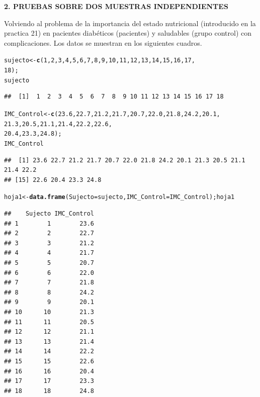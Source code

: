 \documentclass[12pt,letterpaper]{article}\usepackage[]{graphicx}\usepackage[]{color}
\makeatletter
\newcommand{\hlnum}[1]{\textcolor[rgb]{0.686,0.059,0.569}{#1}}%
\newcommand{\hlstd}[1]{\textcolor[rgb]{0.345,0.345,0.345}{#1}}%
\newcommand{\hlkwb}[1]{\textcolor[rgb]{0.69,0.353,0.396}{#1}}%
\newcommand{\hlkwc}[1]{\textcolor[rgb]{0.333,0.667,0.333}{#1}}%
\newcommand{\hlkwd}[1]{\textcolor[rgb]{0.737,0.353,0.396}{\textbf{#1}}}%
\newenvironment{kframe}{%
 \def\at@end@of@kframe{}%
 \ifinner\ifhmode%
  \def\at@end@of@kframe{\end{minipage}}%
  \begin{minipage}{\columnwidth}%
 \fi\fi%
 \def\FrameCommand##1{\hskip\@totalleftmargin \hskip-\fboxsep
 \colorbox{shadecolor}{##1}\hskip-\fboxsep
     \hskip-\linewidth \hskip-\@totalleftmargin \hskip\columnwidth}%
 \MakeFramed {\advance\hsize-\width
   \@totalleftmargin\z@ \linewidth\hsize
   \@setminipage}}%
 {\par\unskip\endMakeFramed%
 \at@end@of@kframe}
\newenvironment{knitrout}{}{} %
\makeatother
\begin{document}
\begin{center}
\textbf{2. PRUEBAS SOBRE DOS MUESTRAS INDEPENDIENTES}
\end{center}

Volviendo al problema de la importancia del estado nutricional (introducido en la practica 21) en pacientes diab\'eticos (pacientes) y saludables (grupo control) con complicaciones. Los datos se muestran en los siguientes cuadros.

\begin{knitrout}
\color{fgcolor}\begin{kframe}
\begin{alltt}
\hlstd{sujecto} \hlkwb{<-} \hlkwd{c}\hlstd{(}\hlnum{1}\hlstd{,} \hlnum{2}\hlstd{,} \hlnum{3}\hlstd{,} \hlnum{4}\hlstd{,} \hlnum{5}\hlstd{,} \hlnum{6}\hlstd{,} \hlnum{7}\hlstd{,} \hlnum{8}\hlstd{,} \hlnum{9}\hlstd{,} \hlnum{10}\hlstd{,} \hlnum{11}\hlstd{,} \hlnum{12}\hlstd{,} \hlnum{13}\hlstd{,} \hlnum{14}\hlstd{,} \hlnum{15}\hlstd{,} \hlnum{16}\hlstd{,} \hlnum{17}\hlstd{,}
                       \hlnum{18}\hlstd{);}
\hlstd{sujecto}
\end{alltt}
\begin{verbatim}
##  [1]  1  2  3  4  5  6  7  8  9 10 11 12 13 14 15 16 17 18
\end{verbatim}
\begin{alltt}
\hlstd{IMC_Control} \hlkwb{<-} \hlkwd{c}\hlstd{(}\hlnum{23.6}\hlstd{,} \hlnum{22.7}\hlstd{,} \hlnum{21.2}\hlstd{,} \hlnum{21.7}\hlstd{,} \hlnum{20.7}\hlstd{,} \hlnum{22.0}\hlstd{,} \hlnum{21.8}\hlstd{,} \hlnum{24.2}\hlstd{,} \hlnum{20.1}\hlstd{,}
                 \hlnum{21.3}\hlstd{,} \hlnum{20.5}\hlstd{,} \hlnum{21.1}\hlstd{,} \hlnum{21.4}\hlstd{,} \hlnum{22.2}\hlstd{,} \hlnum{22.6}\hlstd{,}
                 \hlnum{20.4}\hlstd{,} \hlnum{23.3}\hlstd{,} \hlnum{24.8}\hlstd{);}
\hlstd{IMC_Control}
\end{alltt}
\begin{verbatim}
##  [1] 23.6 22.7 21.2 21.7 20.7 22.0 21.8 24.2 20.1 21.3 20.5 21.1 21.4 22.2
## [15] 22.6 20.4 23.3 24.8
\end{verbatim}
\begin{alltt}
\hlstd{hoja1} \hlkwb{<-} \hlkwd{data.frame}\hlstd{(}\hlkwc{Sujecto}\hlstd{=sujecto,} \hlkwc{IMC_Control}\hlstd{=IMC_Control); hoja1}
\end{alltt}
\begin{verbatim}
##    Sujecto IMC_Control
## 1        1        23.6
## 2        2        22.7
## 3        3        21.2
## 4        4        21.7
## 5        5        20.7
## 6        6        22.0
## 7        7        21.8
## 8        8        24.2
## 9        9        20.1
## 10      10        21.3
## 11      11        20.5
## 12      12        21.1
## 13      13        21.4
## 14      14        22.2
## 15      15        22.6
## 16      16        20.4
## 17      17        23.3
## 18      18        24.8
\end{verbatim}
\end{kframe}
\end{knitrout}
\end{document}
